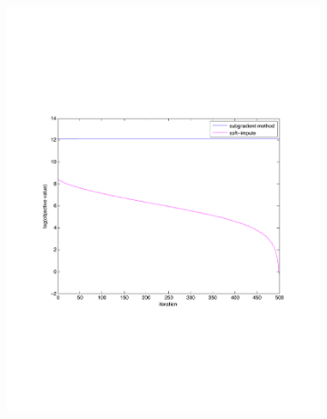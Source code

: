 \begin{figure}[h!tbp]
    \centering
    \begin{subfigure}[a]{0.6\textwidth}
        \includegraphics[width=\textwidth]{img/p3_03.pdf}
    \end{subfigure}
    \begin{subfigure}[a]{0.6\textwidth}

\end{subfigure}
\end{figure}
